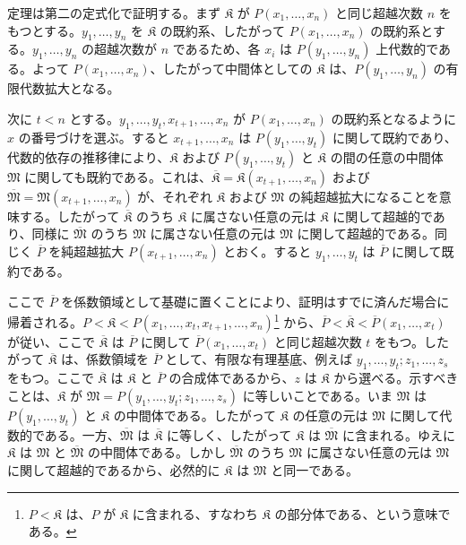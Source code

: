\documentclass[11pt]{article}
\begin{document}
定理は第二の定式化で証明する。まず $\mathfrak K$ が $P(x_1,\ldots,x_n)$ と同じ超越次数 $n$ をもつとする。$y_1,\ldots,y_n$ を $\mathfrak K$ の既約系、したがって $P(x_1,\ldots,x_n)$ の既約系とする。$y_1,\ldots,y_n$ の超越次数が $n$ であるため、各 $x_i$ は $P(y_1,\ldots,y_n)$ 上代数的である。よって $P(x_1,\ldots,x_n)$、したがって中間体としての $\mathfrak K$ は、$P(y_1,\ldots,y_n)$ の有限代数拡大となる。

次に $t<n$ とする。$y_1,\ldots,y_t,x_{t+1},\ldots,x_n$ が $P(x_1,\ldots,x_n)$ の既約系となるように $x$ の番号づけを選ぶ。すると $x_{t+1},\ldots,x_n$ は $P(y_1,\ldots,y_t)$ に関して既約であり、代数的依存の推移律により、$\mathfrak K$ および $P(y_1,\ldots,y_t)$ と $\mathfrak K$ の間の任意の中間体 $\mathfrak M$ に関しても既約である。これは、$\overline{\mathfrak K}=\mathfrak K(x_{t+1},\ldots,x_n)$ および $\overline{\mathfrak M}=\mathfrak M(x_{t+1},\ldots,x_n)$ が、それぞれ $\mathfrak K$ および $\mathfrak M$ の純超越拡大になることを意味する。したがって $\overline{\mathfrak K}$ のうち $\mathfrak K$ に属さない任意の元は $\mathfrak K$ に関して超越的であり、同様に $\overline{\mathfrak M}$ のうち $\mathfrak M$ に属さない任意の元は $\mathfrak M$ に関して超越的である。同じく $\overline P$ を純超越拡大 $P(x_{t+1},\ldots,x_n)$ とおく。すると $y_1,\ldots,y_t$ は $\overline P$ に関して既約である。

ここで $\overline P$ を係数領域として基礎に置くことにより、証明はすでに済んだ場合に帰着される。$P<\mathfrak K<P(x_1,\ldots,x_t,x_{t+1},\ldots,x_n)$\footnote{$P<\mathfrak K$ は、$P$ が $\mathfrak K$ に含まれる、すなわち $\mathfrak K$ の部分体である、という意味である。} から、$\overline P<\overline{\mathfrak K}<\overline P(x_1,\ldots,x_t)$ が従い、ここで $\overline{\mathfrak K}$ は $\overline P$ に関して $\overline P(x_1,\ldots,x_t)$ と同じ超越次数 $t$ をもつ。したがって $\overline{\mathfrak K}$ は、係数領域を $\overline P$ として、有限な有理基底、例えば $y_1,\ldots,y_t; z_1,\ldots,z_s$ をもつ。ここで $\overline{\mathfrak K}$ は $\mathfrak K$ と $\overline P$ の合成体であるから、$z$ は $\mathfrak K$ から選べる。示すべきことは、$\mathfrak K$ が $\mathfrak M=P(y_1,\ldots,y_t;z_1,\ldots,z_s)$ に等しいことである。いま $\mathfrak M$ は $P(y_1,\ldots,y_t)$ と $\mathfrak K$ の中間体である。したがって $\mathfrak K$ の任意の元は $\mathfrak M$ に関して代数的である。一方、$\overline{\mathfrak M}$ は $\overline{\mathfrak K}$ に等しく、したがって $\mathfrak K$ は $\overline{\mathfrak M}$ に含まれる。ゆえに $\mathfrak K$ は $\mathfrak M$ と $\overline{\mathfrak M}$ の中間体である。しかし $\overline{\mathfrak M}$ のうち $\mathfrak M$ に属さない任意の元は $\mathfrak M$ に関して超越的であるから、必然的に $\mathfrak K$ は $\mathfrak M$ と同一である。
\end{document}
